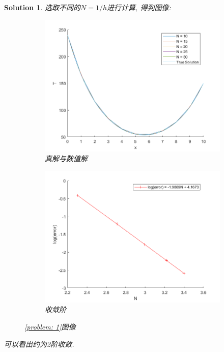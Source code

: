 \documentclass[a4paper, 12pt]{ctexart}
\theoremstyle{plain}
\theoremstyle{plain}
\theoremstyle{plain}
\theoremstyle{nonumberplain}
\newtheorem{solution}{Solution}
\begin{document}
\begin{solution}
        选取不同的$N=1/h$进行计算, 得到图像:
        \begin{figure}[H]
            \centering
            \begin{subfigure}[b]{0.45\textwidth}
                \centering
                \includegraphics[width=\textwidth]{wc11.png}
                \caption{真解与数值解}
            \end{subfigure}
            \hfill
            \begin{subfigure}[b]{0.45\textwidth}
                \centering
                \includegraphics[width=\textwidth]{wc12.png}
                \caption{收敛阶}
            \end{subfigure}
            \caption{\ref{problem: 1}图像}
       \end{figure}

        可以看出约为2阶收敛.
    \end{solution}
\end{document}
